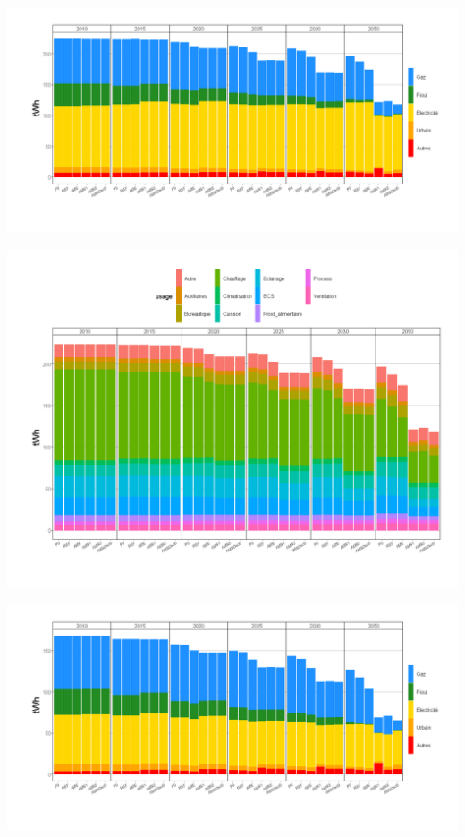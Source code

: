 \documentclass[]{article}
\begin{document}
\includegraphics{Exemple_sortiestertiaire_files/figure-latex/Evol_conso_energie-1.png}

\includegraphics{Exemple_sortiestertiaire_files/figure-latex/Evol_conso_usage-1.png}

\includegraphics{Exemple_sortiestertiaire_files/figure-latex/Evol_conso_energie_usageRT-1.png}
\end{document}
